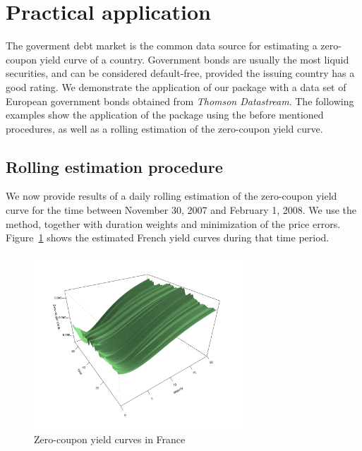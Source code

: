 \section{Practical application}
\label{sec:pract-appl}

The goverment debt market is the common data source for estimating a zero-coupon yield curve of a country. Government bonds are usually the most liquid securities, and can be considered default-free, provided the issuing country has a good rating. We demonstrate the application of our package with a data set of European government bonds obtained from \emph{Thomson Datastream}\texttrademark. The following examples show the application of the package using the before mentioned procedures, as well as a rolling estimation of the zero-coupon yield curve.




\subsection{Rolling estimation procedure}
\label{sec:rolling-estim}

We now provide results of a daily rolling estimation of the zero-coupon yield curve for the time between November 30, 2007 and February 1, 2008. We use the \cite{Svensson1994} method, together with duration weights and minimization of the price errors. Figure~\ref{fig:3dplot} shows the estimated French yield curves during that time period.

\begin{figure}[htb]
  \begin{center}
\includegraphics[width=0.7\textwidth]{3dplot}
  \caption{Zero-coupon yield curves in France}
  \label{fig:3dplot}
\end{center}
\end{figure}

